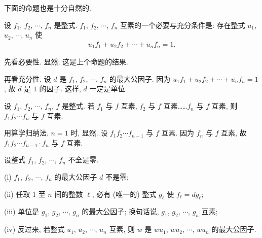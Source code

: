下面的命题也是十分自然的.
\begin{proposition}
    设 $f_1$, $f_2$, $\cdots$, $f_n$ 是整式. $f_1$, $f_2$, $\cdots$, $f_n$ 互素的一个必要与充分条件是: 存在整式 $u_1$, $u_2$, $\cdots$, $u_n$ 使
    \begin{align*}
        u_1 f_1 + u_2 f_2 + \cdots + u_n f_n = 1.
    \end{align*}
\end{proposition}

\begin{pf}
    先看必要性. 显然; 这是上个命题的结果.

    再看充分性. 设 $d$ 是 $f_1$, $f_2$, $\cdots$, $f_n$ 的最大公因子. 因为 $u_1 f_1 + u_2 f_2 + \cdots + u_n f_n = 1$, 故 $d$ 是 $1$ 的因子. 这样, $d$ 一定是单位.
\end{pf}

\begin{proposition}
    设 $f_1$, $f_2$, $\cdots$, $f_n$, $f$ 是整式. 若 $f_1$ 与 $f$ 互素, $f_2$ 与 $f$ 互素……$f_n$ 与 $f$ 互素, 则 $f_1 f_2 \cdots f_n$ 与 $f$ 互素.
\end{proposition}

\begin{pf}
    用算学归纳法. $n = 1$ 时, 显然. 设 $f_1 f_2 \cdots f_{n-1}$ 与 $f$ 互素. 因为 $f_n$ 与 $f$ 互素, 故 $f_1 f_2 \cdots f_{n-1} \cdot f_n$ 与 $f$ 互素.
\end{pf}

\begin{proposition}
    设整式 $f_1$, $f_2$, $\cdots$, $f_n$ 不全是零.

    (i) $f_1$, $f_2$, $\cdots$, $f_n$ 的最大公因子 $d$ 不是零;

    (ii) 任取 $1$ 至 $n$ 间的整数 $\ell$, 必有 (唯一的) 整式 $g_\ell$ 使 $f_\ell = dg_\ell$;

    (iii) 单位是 $g_1$, $g_2$, $\cdots$, $g_n$ 的最大公因子; 换句话说, $g_1$, $g_2$, $\cdots$, $g_n$ 互素;

    (iv) 反过来, 若整式 $u_1$, $u_2$, $\cdots$, $u_n$ 互素, 则 $w$ 是 $wu_1$, $wu_2$, $\cdots$, $wu_n$ 的最大公因子.
\end{proposition}

